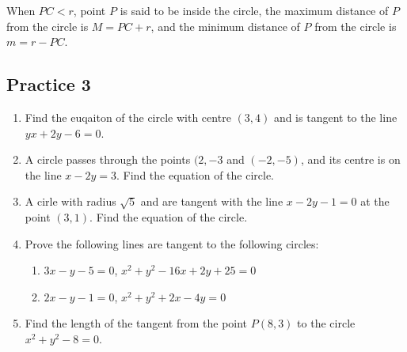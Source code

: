 \documentclass{report}
\begin{document}
\begin{multicols}{2}
    When $PC < r$, point $P$ is said to be inside the circle, the maximum distance
    of $P$ from the circle is $M = PC + r$, and the minimum distance of $P$ from
    the circle is $m = r - PC$.
    \begin{center}
    \end{center}

    \subsection{Practice 3}

    \begin{enumerate}
        \item Find the euqaiton of the circle with centre $(3, 4)$ and is tangent to the line
              $yx + 2y - 6 = 0$.
        \item A circle passes through the points $(2, -3$ and $(-2, -5)$, and its centre is
              on the line $x - 2y = 3$. Find the equation of the circle.
        \item A cirle with radius $\sqrt{5}$ and are tangent with the line $x - 2y - 1 = 0$
              at the point $(3, 1)$. Find the equation of the circle.
        \item Prove the following lines are tangent to the following circles:
              \begin{enumerate}
                  \item $3x - y - 5 = 0$, $x^2 + y^2 - 16x + 2y + 25 = 0$
                  \item $2x - y - 1 = 0$, $x^2 + y^2 + 2x - 4y = 0$
              \end{enumerate}
        \item Find the length of the tangent from the point $P(8, 3)$ to the circle $x^2 +
                  y^2 - 8 = 0$.
    \end{enumerate}


\end{multicols}
\end{document}
